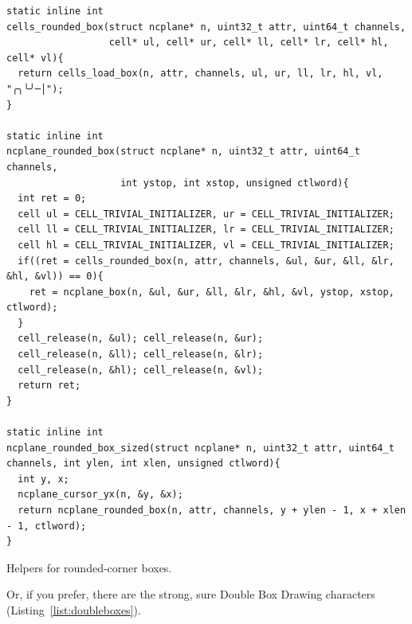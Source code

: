 \documentclass[letterpaper,10pt]{article}
\begin{document}
\begin{listing}[!htb]
\begin{verbatim}
static inline int
cells_rounded_box(struct ncplane* n, uint32_t attr, uint64_t channels,
                  cell* ul, cell* ur, cell* ll, cell* lr, cell* hl, cell* vl){
  return cells_load_box(n, attr, channels, ul, ur, ll, lr, hl, vl, "╭╮╰╯─│");
}

static inline int
ncplane_rounded_box(struct ncplane* n, uint32_t attr, uint64_t channels,
                    int ystop, int xstop, unsigned ctlword){
  int ret = 0;
  cell ul = CELL_TRIVIAL_INITIALIZER, ur = CELL_TRIVIAL_INITIALIZER;
  cell ll = CELL_TRIVIAL_INITIALIZER, lr = CELL_TRIVIAL_INITIALIZER;
  cell hl = CELL_TRIVIAL_INITIALIZER, vl = CELL_TRIVIAL_INITIALIZER;
  if((ret = cells_rounded_box(n, attr, channels, &ul, &ur, &ll, &lr, &hl, &vl)) == 0){
    ret = ncplane_box(n, &ul, &ur, &ll, &lr, &hl, &vl, ystop, xstop, ctlword);
  }
  cell_release(n, &ul); cell_release(n, &ur);
  cell_release(n, &ll); cell_release(n, &lr);
  cell_release(n, &hl); cell_release(n, &vl);
  return ret;
}

static inline int
ncplane_rounded_box_sized(struct ncplane* n, uint32_t attr, uint64_t channels, int ylen, int xlen, unsigned ctlword){
  int y, x;
  ncplane_cursor_yx(n, &y, &x);
  return ncplane_rounded_box(n, attr, channels, y + ylen - 1, x + xlen - 1, ctlword);
}
\end{verbatim}
\caption{Helpers for rounded-corner boxes.}
\label{list:roundboxes}
\end{listing}

Or, if you prefer, there are the strong, sure Double Box Drawing characters (Listing~\ref{list:doubleboxes}).
\end{document}
